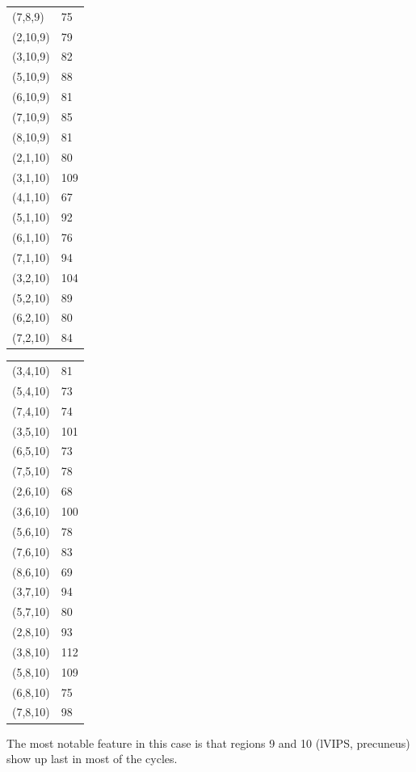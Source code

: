 \documentclass[11pt]{article}
\begin{document}
\begin{minipage}{.25\textwidth}
\begin{tabular}{ll}
(7,8,9) & 75 \\
(2,10,9) & 79 \\
(3,10,9) & 82 \\
(5,10,9) & 88 \\
(6,10,9) & 81 \\
(7,10,9) & 85 \\
(8,10,9) & 81 \\
(2,1,10) & 80 \\
(3,1,10) & 109 \\
(4,1,10) & 67 \\
(5,1,10) & 92 \\
(6,1,10) & 76 \\
(7,1,10) & 94 \\
(3,2,10) & 104 \\
(5,2,10) & 89 \\
(6,2,10) & 80 \\
(7,2,10) & 84 \\
\end{tabular}
\end{minipage}
\begin{minipage}{.25\textwidth}
\begin{tabular}{ll}
(3,4,10) & 81 \\
(5,4,10) & 73 \\
(7,4,10) & 74 \\
(3,5,10) & 101 \\
(6,5,10) & 73 \\
(7,5,10) & 78 \\
(2,6,10) & 68 \\
(3,6,10) & 100 \\
(5,6,10) & 78 \\
(7,6,10) & 83 \\
(8,6,10) & 69 \\
(3,7,10) & 94 \\
(5,7,10) & 80 \\
(2,8,10) & 93 \\
(3,8,10) & 112 \\
(5,8,10) & 109 \\
(6,8,10) & 75 \\
(7,8,10) & 98 \\
\end{tabular}
\end{minipage}
\vskip 10pt

The most notable feature in this case is that regions 9 and 10 (lVIPS, precuneus) show up last in most of the cycles.
\end{document}
